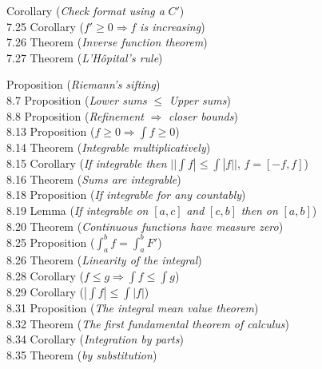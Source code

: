 \documentclass[12pt]{article}
\begin{document}
\vspace{0.5em}

 Corollary (\emph{Check format using a} $C'$)  \\
7.25 Corollary ($f' \geq 0 \Rightarrow f$ \emph{is increasing})  \\
7.26 Theorem (\emph{Inverse function theorem})  \\
7.27 Theorem (\emph{L'Hôpital's rule})  \\

\vspace{0.5em}

 Proposition (\emph{Riemann's sifting})  \\
8.7 Proposition (\emph{Lower sums} $\leq$ \emph{Upper sums})  \\
8.8 Proposition (\emph{Refinement} $\Rightarrow$ \emph{closer bounds})  \\
8.13 Proposition ($f \geq 0 \Rightarrow \int f \geq 0$)  \\
8.14 Theorem (\emph{Integrable multiplicatively})  \\
8.15 Corollary (\emph{If integrable then} $||\int f| \leq \int |f||$, $f = [-f, f]$)  \\
8.16 Theorem (\emph{Sums are integrable})  \\
8.18 Proposition (\emph{If integrable for any countably})  \\
8.19 Lemma (\emph{If integrable on} $[a, c]$ \emph{and} $[c, b]$ \emph{then on} $[a, b]$)  \\
8.20 Theorem (\emph{Continuous functions have measure zero})  \\
8.25 Proposition ($\int_a^b f = \int_a^b F'$)  \\
8.26 Theorem (\emph{Linearity of the integral})  \\
8.28 Corollary ($f \leq g \Rightarrow \int f \leq \int g$)  \\
8.29 Corollary ($|\int f| \leq \int |f|$)  \\
8.31 Proposition (\emph{The integral mean value theorem})  \\
8.32 Theorem (\emph{The first fundamental theorem of calculus})  \\
8.34 Corollary (\emph{Integration by parts})  \\
8.35 Theorem (\emph{by substitution})  \\
\end{document}
